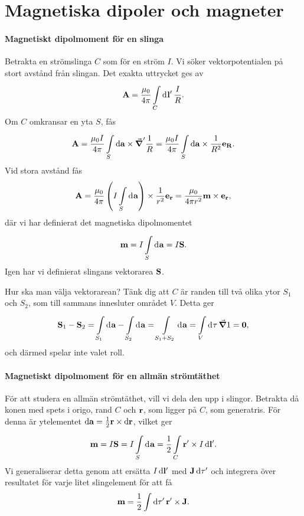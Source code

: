 \section{Magnetiska dipoler och magneter}

\paragraph{Magnetiskt dipolmoment för en slinga}
Betrakta en strömslinga $C$ som för en ström $I$. Vi söker vektorpotentialen på stort avstånd från slingan. Det exakta uttrycket ges av
\begin{align*}
	\vb{A} = \frac{\mu_{0}}{4\pi}\int\limits_{C}^{}\dd[]{\vb{l}'}\frac{I}{R}.
\end{align*}
Om $C$ omkransar en yta $S$, fås
\begin{align*}
	\vb{A} = \frac{\mu_{0}I}{4\pi}\int\limits_{S}^{}\dd{\vb{a}}\times \grad^{\prime}{\frac{1}{R}} = \frac{\mu_{0}I}{4\pi}\int\limits_{S}^{}\dd{\vb{a}}\times \frac{1}{R^{2}}\vb{e}_{\vb{R}}.
\end{align*}
Vid stora avstånd fås
\begin{align*}
	\vb{A} = \frac{\mu_{0}}{4\pi}\left(I\int\limits_{S}^{}\dd[]{\vb{a}}\right)\times\frac{1}{r^{2}}\vb{e}_{\vb{r}} = \frac{\mu_{0}}{4\pi r^{2}}\vb{m}\times\vb{e}_{\vb{r}},
\end{align*}
där vi har definierat det magnetiska dipolmomentet
\begin{align*}
	\vb{m} = I\int\limits_{S}^{}\dd[]{\vb{a}} = I\vb{S}.
\end{align*}
Igen har vi definierat slingans vektorarea $\vb{S}$.

Hur ska man välja vektorarean? Tänk dig att $C$ är randen till två olika ytor $S_{1}$ och $S_{2}$, som till sammans innesluter området $V$. Detta ger
\begin{align*}
	\vb{S}_{1} - \vb{S}_{2} = \int\limits_{S_{1}}^{}\dd[]{\vb{a}} - \int\limits_{S_{2}}^{}\dd[]{\vb{a}} = \int\limits_{S_{1} + S_{2}}^{}\dd[]{\vb{a}} = \int\limits_{V}^{}\dd[]{\tau}\grad{1} = \vb{0},
\end{align*}
och därmed spelar inte valet roll.

\paragraph{Magnetiskt dipolmoment för en allmän strömtäthet}
För att studera en allmän strömtäthet, vill vi dela den upp i slingor. Betrakta då konen med spets i origo, rand $C$ och $\vb{r}$, som ligger på $C$, som generatris. För denna är ytelementet $\dd{\vb{a}} = \frac{1}{2}\vb{r}\times\dd{\vb{r}}$, vilket ger
\begin{align*}
	\vb{m} = I\vb{S} = I\int\limits_{S}^{}\dd[]{\vb{a}} = \frac{1}{2}\int\limits_{C}{\vb{r}'\times I\dd{\vb{l}'}}.
\end{align*}
Vi generaliserar detta genom att ersätta $I\dd{\vb{l}'}$ med $\vb{J}\dd{\tau'}$ och integrera över resultatet för varje litet slingelement för att få
\begin{align*}
	\vb{m} = \frac{1}{2}\int{\dd{\tau'}\vb{r}'\times \vb{J}}.
\end{align*}

